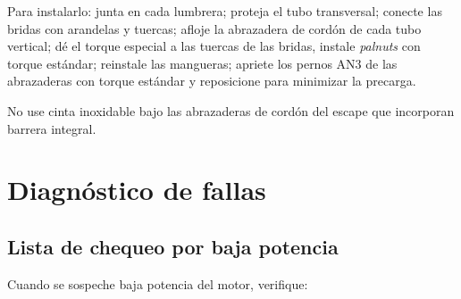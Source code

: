 Para instalarlo: junta en cada lumbrera; proteja el tubo transversal; conecte las bridas con arandelas y tuercas; afloje la abrazadera de cordón de cada tubo vertical; dé el torque especial a las tuercas de las bridas, instale \emph{palnuts} con torque estándar; reinstale las mangueras; apriete los pernos AN3 de las abrazaderas con torque estándar y reposicione para minimizar la precarga.

\begin{nota}
No use cinta inoxidable bajo las abrazaderas de cordón del escape que incorporan barrera integral.
\end{nota}

\section{Diagnóstico de fallas}

\subsection{Lista de chequeo por baja potencia}

Cuando se sospeche baja potencia del motor, verifique:

